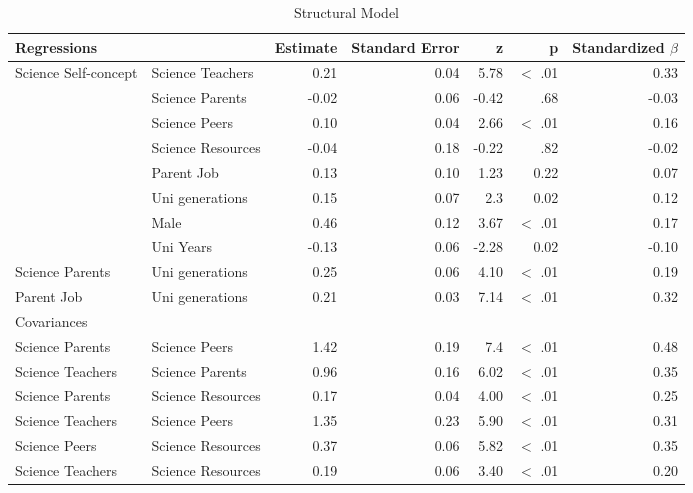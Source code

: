 \begin{landscape}
\begin{table}[ht]
\caption{Structural Model} 

\centering
\begin{tabular}{llrrrrr}
  \hline
 Regressions &  & Estimate & Standard Error & z & p & Standardized $\beta$ \\ 
  \hline

  Science Self-concept & Science Teachers & 0.21 & 0.04 & 5.78 & $<$ .01 & 0.33 \\ 
   & Science Parents & -0.02 & 0.06 & -0.42 & .68 & -0.03 \\ 
   & Science Peers & 0.10 & 0.04 & 2.66 & $<$ .01 & 0.16 \\ 
   & Science Resources & -0.04 & 0.18 & -0.22 & .82 & -0.02 \\ 
   & Parent Job & 0.13 & 0.10 & 1.23 & 0.22 & 0.07 \\ 
   & Uni generations & 0.15 & 0.07 & 2.3 & 0.02 & 0.12 \\ 
   & Male & 0.46 & 0.12 & 3.67 & $<$ .01 & 0.17 \\ 
   & Uni Years & -0.13 & 0.06 & -2.28 & 0.02 & -0.10 \\ 
  Science Parents & Uni generations & 0.25 & 0.06 & 4.10 & $<$ .01 & 0.19 \\ 
  Parent Job & Uni generations & 0.21 & 0.03 & 7.14 & $<$ .01 & 0.32 \\ 
  \hline
Covariances &  &  &  &  & &  \\ 
  \hline
  Science Parents & Science Peers & 1.42 & 0.19 & 7.4 & $<$ .01 & 0.48 \\ 
  Science Teachers & Science Parents & 0.96 & 0.16 & 6.02 & $<$ .01 & 0.35 \\ 
  Science Parents & Science Resources & 0.17 & 0.04 & 4.00 & $<$ .01 & 0.25 \\ 
  Science Teachers & Science Peers & 1.35 & 0.23 & 5.90 & $<$ .01 & 0.31 \\ 
  Science Peers & Science Resources & 0.37 & 0.06 & 5.82 & $<$ .01 & 0.35 \\ 
  Science Teachers & Science Resources & 0.19 & 0.06 & 3.40 & $<$ .01 & 0.20 \\ 
   

\end{tabular}
\end{table}
\end{landscape}
